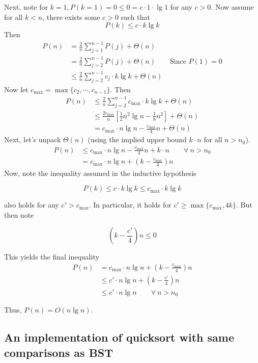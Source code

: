 \documentclass[paper=a4, fontsize=11pt]{scrartcl} %
\numberwithin{equation}{section} %
\numberwithin{figure}{section} %
\numberwithin{table}{section} %
\begin{document}
Next, note for $k = 1, P(k = 1) = 0 \leq 0 = c \cdot 1 \cdot \lg 1$ for any $c > 0$. Now assume for all $k < n$, there exists some $c > 0$ such that
\[P(k) \leq c \cdot k \lg k\]
Then
\begin{align*}
P(n) &= \frac{2}{n}\sum_{j = 1}^{n-1} P(j) + \Theta(n) \\
	&=  \frac{2}{n}\sum_{j = 2}^{n-1} P(j) + \Theta(n) \qquad{} \textrm{Since } P(1) = 0\\
	&\leq \frac{2}{n}\sum_{j = 2}^{n-1} c_j \cdot k \lg k + \Theta(n)
\end{align*}
Now let $c_{\max} = \max\{c_2, \cdots, c_{n -1}\}$. Then
\begin{align*}
P(n) &\leq \frac{2}{n}\sum_{j = 2}^{n-1} c_{\max} \cdot k \lg k + \Theta(n) \\ 
	&\leq \frac{2c_{\max}}{n}\left[\frac{1}{2}n^2 \lg n - \frac{1}{8}n^2\right] + \Theta(n) \\ 
	&= c_{\max} \cdot n \lg n - \frac{c_{\max}}{4} n + \Theta(n)
\end{align*}
Next, let's unpack $\Theta(n)$ (using the implied upper bound $k\cdot n$ for all $n > n_0$).
\begin{align*}
P(n) &\leq c_{\max} \cdot n \lg n - \frac{c_{\max}}{4} n + k \cdot n \qquad{} \forall ~ n > n_0\\
	&= c_{\max} \cdot n \lg n + \left(k - \frac{c_{\max}}{4}\right) n
\end{align*}
Now, note the inequality assumed in the inductive hypothesis

\[P(k) \leq c \cdot k \lg k \leq c_{\max} \cdot k \lg k\]

also holds for any $c' > c_{\max}$. In particular, it holds for $c' \geq \max\{c_{\max}, 4k\}$. But then note

\[\left(k - \frac{c'}{4}\right) n \leq 0\]

This yields the final inequality
\begin{align*}
P(n) 	&= c_{\max} \cdot n \lg n + \left(k - \frac{c_{\max}}{4}\right) n \\
	&\leq c' \cdot n \lg n + \left(k - \frac{c'}{4}\right) n \\
	&\leq c' \cdot n \lg n \qquad{}  \forall ~ n > n_0
\end{align*}

Thus, $P(n) = O(n \lg n)$.

\subsection{An implementation of quicksort with same comparisons as BST}
\end{document}
